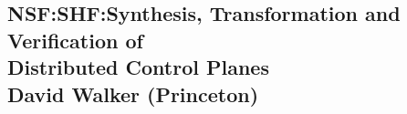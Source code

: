 \documentclass[11pt]{article}
\begin{document}

%

\newpage
{}
\setcounter{page}{1}

\begin{centering}
\section*{{\LARGE NSF:SHF:Synthesis, Transformation and Verification of\\
            Distributed Control Planes} \\
   {\normalsize David Walker (Princeton)} }
\end{centering}

\makeatletter
\renewcommand{\paragraph}{%
  \@startsection{paragraph}{4}%
  {\z@}{0.5ex \@plus 0.5ex \@minus .2ex}{-1em}%
  {\normalfont\normalsize\bfseries}%
}
\makeatother



\newpage

\setcounter{page}{1}



\newpage
\end{document}
